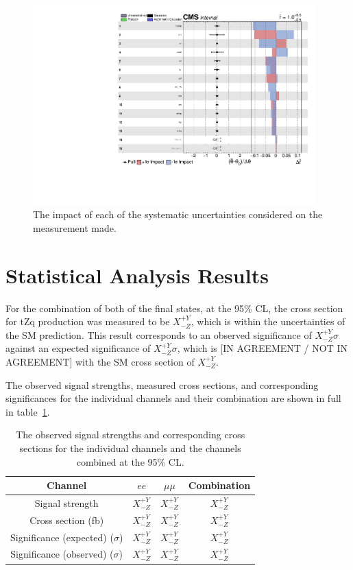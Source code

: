 \begin{figure}[htbp]
\begin{center}
\includegraphics[width=0.97\textwidth]{figs/results/systematicsImpact.pdf}
\caption{The impact of each of the systematic uncertainties considered on the measurement made.}
\label{fig:systematicsPull}
\end{center}
\end{figure}

\section{Statistical Analysis Results}
For the combination of both of the final states, at the 95\% CL, the cross section for tZq production was measured to be $X^{+Y}_{-Z}$, which is within the uncertainties of the SM prediction.
This result corresponds to an observed significance of $X_{-Z}^{+Y} \sigma$ against an expected significance of $X_{-Z}^{+Y} \sigma$, which is [IN AGREEMENT / NOT IN AGREEMENT] with the SM cross section of  $X^{+Y}_{-Z}$.

The observed signal strengths, measured cross sections, and corresponding significances for the individual channels and their combination are shown in full in table~\ref{tab:shapetxs}.

\begin{table}[!h]
   \centering
   \caption{The observed signal strengths and corresponding cross sections for
   the individual channels and the channels combined at the 95\% CL.}
   \begin{tabular}{cccc}
       \hline
       Channel & $ee$ & $\mu\mu$ & \textbf{Combination} \\
        \hline
       Signal strength & $X_{-Z}^{+Y}$ & $X_{-Z}^{+Y}$ & $X_{-Z}^{+Y}$ \\
       Cross section (fb) & $X_{-Z}^{+Y}$ & $X_{-Z}^{+Y}$ & $X_{-Z}^{+Y}$ \\
       Significance (expected) ($\sigma$) & $X_{-Z}^{+Y}$ & $X_{-Z}^{+Y}$ & $X_{-Z}^{+Y}$ \\
       Significance (observed) ($\sigma$) & $X_{-Z}^{+Y}$ & $X_{-Z}^{+Y}$ & $X_{-Z}^{+Y}$ \\
    \end{tabular}
   \label{tab:shapetxs}
\end{table}

